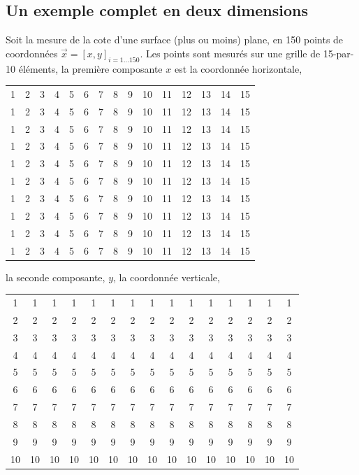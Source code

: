 \documentclass[main.tex]{subfiles}
\begin{document}
\subsection{Un exemple complet en deux dimensions}

Soit la mesure de la cote d'une surface (plus ou moins) plane, en 150 points de coordonnées $\vec{x}=[x,y]_{i=1\dots 150}$. Les points sont mesurés sur une grille de 15-par-10 éléments, la première composante $x$ est la coordonnée horizontale,
\begin{center}
    \begin{tabular}{ccccccccccccccc}
        1 & 2 & 3 & 4 & 5 & 6 & 7 & 8 & 9 & 10 & 11 & 12 & 13 & 14 & 15 \\
        1 & 2 & 3 & 4 & 5 & 6 & 7 & 8 & 9 & 10 & 11 & 12 & 13 & 14 & 15 \\
        1 & 2 & 3 & 4 & 5 & 6 & 7 & 8 & 9 & 10 & 11 & 12 & 13 & 14 & 15 \\
        1 & 2 & 3 & 4 & 5 & 6 & 7 & 8 & 9 & 10 & 11 & 12 & 13 & 14 & 15 \\
        1 & 2 & 3 & 4 & 5 & 6 & 7 & 8 & 9 & 10 & 11 & 12 & 13 & 14 & 15 \\
        1 & 2 & 3 & 4 & 5 & 6 & 7 & 8 & 9 & 10 & 11 & 12 & 13 & 14 & 15 \\
        1 & 2 & 3 & 4 & 5 & 6 & 7 & 8 & 9 & 10 & 11 & 12 & 13 & 14 & 15 \\
        1 & 2 & 3 & 4 & 5 & 6 & 7 & 8 & 9 & 10 & 11 & 12 & 13 & 14 & 15 \\
        1 & 2 & 3 & 4 & 5 & 6 & 7 & 8 & 9 & 10 & 11 & 12 & 13 & 14 & 15 \\
        1 & 2 & 3 & 4 & 5 & 6 & 7 & 8 & 9 & 10 & 11 & 12 & 13 & 14 & 15
    \end{tabular}
\end{center}
la seconde composante, $y$, la coordonnée verticale,
\begin{center}
    \begin{tabular}{ccccccccccccccc}
        1  & 1  & 1  & 1  & 1  & 1  & 1  & 1  & 1  & 1  & 1  & 1  & 1  & 1  & 1  \\
        2  & 2  & 2  & 2  & 2  & 2  & 2  & 2  & 2  & 2  & 2  & 2  & 2  & 2  & 2  \\
        3  & 3  & 3  & 3  & 3  & 3  & 3  & 3  & 3  & 3  & 3  & 3  & 3  & 3  & 3  \\
        4  & 4  & 4  & 4  & 4  & 4  & 4  & 4  & 4  & 4  & 4  & 4  & 4  & 4  & 4  \\
        5  & 5  & 5  & 5  & 5  & 5  & 5  & 5  & 5  & 5  & 5  & 5  & 5  & 5  & 5  \\
        6  & 6  & 6  & 6  & 6  & 6  & 6  & 6  & 6  & 6  & 6  & 6  & 6  & 6  & 6  \\
        7  & 7  & 7  & 7  & 7  & 7  & 7  & 7  & 7  & 7  & 7  & 7  & 7  & 7  & 7  \\
        8  & 8  & 8  & 8  & 8  & 8  & 8  & 8  & 8  & 8  & 8  & 8  & 8  & 8  & 8  \\
        9  & 9  & 9  & 9  & 9  & 9  & 9  & 9  & 9  & 9  & 9  & 9  & 9  & 9  & 9  \\
        10 & 10 & 10 & 10 & 10 & 10 & 10 & 10 & 10 & 10 & 10 & 10 & 10 & 10 & 10
    \end{tabular}
\end{center}
\end{document}
